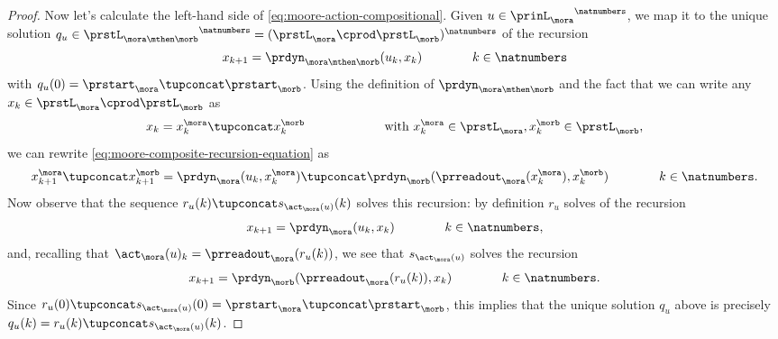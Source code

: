 \begin{proof}
    Now let's calculate the left-hand side of \cref{eq:moore-action-compositional}.
    Given $u \in {\prinL_{\mora}}^\natnumbers$, we map it to the unique solution $q_u \in {\prstL_{\mora \mthen \morb}}^\natnumbers = ({\prstL_{\mora} \cprod \prstL_{\morb}})^\natnumbers$ of the recursion
    \begin{equation}
        \label{eq:moore-composite-recursion-equation}
        x_{k+1} = \prdyn_{\mora \mthen \morb}(u_k, x_k)  \qquad \qquad k \in \natnumbers
    \end{equation}
    with $q_u(0) = \prstart_{\mora} \tupconcat \prstart_{\morb}$.
    Using the definition of $\prdyn_{\mora \mthen \morb}$ and the fact that we can write any $x_k \in \prstL_{\mora} \cprod \prstL_{\morb}$ as
    $$x_k = x^\mora_k \tupconcat x^\morb_k \qquad \qquad \qquad \text{ with } x^\mora_k \in \prstL_{\mora}, x^\morb_k \in \prstL_{\morb},$$
    we can rewrite \cref{eq:moore-composite-recursion-equation} as
    \begin{equation}
        x^\mora_{k+1} \tupconcat x^\morb_{k+1} = \prdyn_{\mora}(u_k, x^\mora_k) \tupconcat \prdyn_{\morb}(\prreadout_\mora(x^\mora_k), x^\morb_k)  \qquad \qquad k \in \natnumbers.
    \end{equation}
    Now observe that the sequence $r_u(k) \tupconcat s_{\act_\mora(u)}(k)$ solves this recursion: by definition $r_u$ solves of the recursion
    \begin{equation}
        x_{k+1} = \prdyn_\mora(u_k, x_k)  \qquad \qquad k \in \natnumbers,
    \end{equation}
    and, recalling that $\act_\mora(u)_k = \prreadout_\mora(r_u(k))$, we see that $s_{\act_\mora(u)}$ solves the recursion
    \begin{equation}
        x_{k+1} = \prdyn_\morb(\prreadout_\mora(r_u(k)), x_k)  \qquad \qquad k \in \natnumbers.
    \end{equation}
    Since $r_u(0) \tupconcat s_{\act_\mora(u)}(0) = \prstart_{\mora} \tupconcat \prstart_{\morb}$, this implies that the unique solution $q_u$ above is precisely $q_u(k) = r_u(k) \tupconcat s_{\act_\mora(u)}(k)$.


\end{proof}
